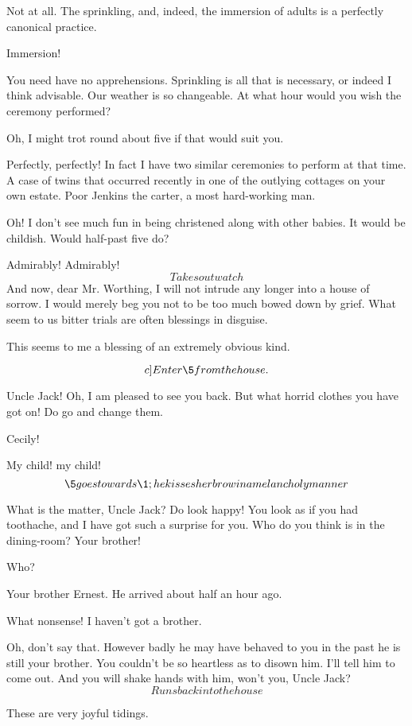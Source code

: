 \documentclass{book}
\begin{document}
\7  Not at all.  The sprinkling, and, indeed, the immersion
of adults is a perfectly canonical practice.

\1  Immersion!

\7  You need have no apprehensions.  Sprinkling is all that
is necessary, or indeed I think advisable.  Our weather is so
changeable.  At what hour would you wish the ceremony performed?

\1  Oh, I might trot round about five if that would suit you.

\7  Perfectly, perfectly!  In fact I have two similar
ceremonies to perform at that time.  A case of twins that occurred
recently in one of the outlying cottages on your own estate.  Poor
Jenkins the carter, a most hard-working man.

\1  Oh!  I don't see much fun in being christened along with
other babies.  It would be childish.  Would half-past five do?

\7  Admirably!  Admirably!  \[Takes out watch\]  And now,
dear Mr. Worthing, I will not intrude any longer into a house of
sorrow.  I would merely beg you not to be too much bowed down by
grief.  What seem to us bitter trials are often blessings in
disguise.

\6  This seems to me a blessing of an extremely obvious
kind.

\[c]Enter \5 from the house.\]

\5  Uncle Jack!  Oh, I am pleased to see you back.  But what
horrid clothes you have got on!  Do go and change them.

\6  Cecily!

\7  My child! my child!  \[\5 goes towards \1; he
kisses her brow in a melancholy manner\]

\5  What is the matter, Uncle Jack?  Do look happy!  You look
as if you had toothache, and I have got such a surprise for you.
Who do you think is in the dining-room?  Your brother!

\1  Who?

\5  Your brother Ernest.  He arrived about half an hour ago.

\1  What nonsense!  I haven't got a brother.

\5  Oh, don't say that.  However badly he may have behaved to
you in the past he is still your brother.  You couldn't be so
heartless as to disown him.  I'll tell him to come out.  And you
will shake hands with him, won't you, Uncle Jack?  \[Runs back into
the house\]

\7  These are very joyful tidings.
\end{document}
